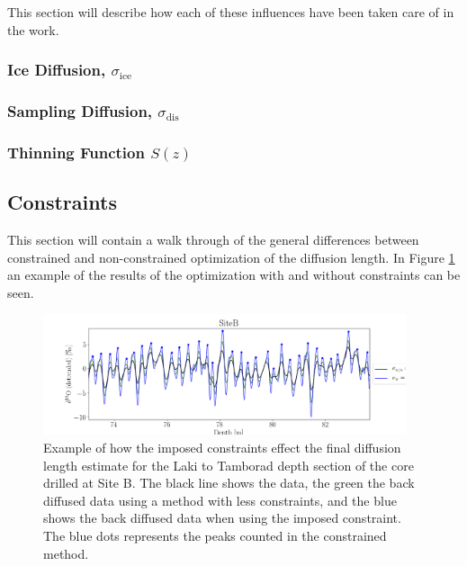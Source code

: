 \documentclass[../../CompleteThesis2/Complete_2ndDraft]{subfiles}
\begin{document}
This section will describe how each of these influences have been taken care of in the work.

\subsubsection{Ice Diffusion, $\sigma_{\text{ice}}$}
\label{Subsubsec:Method_SigmaMethod_SigmaCorrections_IceDiffusion}

\subsubsection{Sampling Diffusion, $\sigma_{\text{dis}}$}
\label{Subsubsec:Method_SigmaMethod_SigmaCorrections_SamplingDiffusion}

\subsubsection{Thinning Function $S(z)$}
\label{Subsubsec:Method_SigmaMethod_SigmaCorrections_ThinningFct}



\subsection[Constraints][Constraints]{Constraints}
\label{Subsec:Method_SigmaMethod_Constraints}
This section will contain a walk through of the general differences between constrained and non-constrained optimization of the diffusion length. In Figure \ref{fig:SiteB_ConstVNoConst} an example of the results of the optimization with and without constraints can be seen.
\begin{figure}[h]
	\centering
	\includegraphics[width=0.95\textwidth]{SiteB_ConstVNoConst.png}
	\caption[Site B Constrained vs. Unconstrained]{\small Example of how the imposed constraints effect the final diffusion length estimate for the Laki to Tamborad depth section of the core drilled at Site B. The black line shows the data, the green the back diffused data using a method with less constraints, and the blue shows the back diffused data when using the imposed constraint. The blue dots represents the peaks counted in the constrained method.}
	\label{fig:SiteB_ConstVNoConst}
\end{figure}
\end{document}
